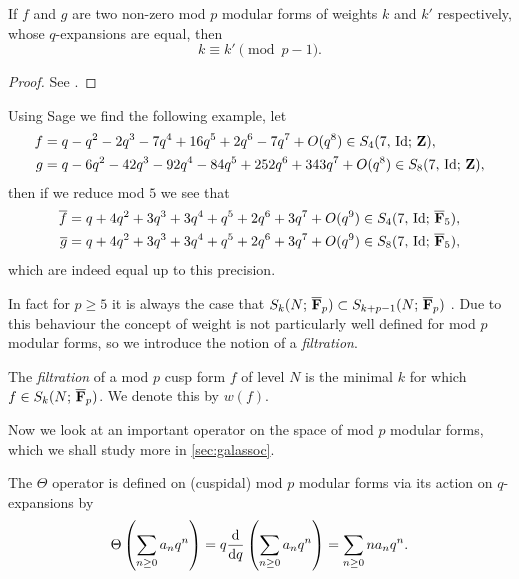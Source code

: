 \documentclass[a4paper,12pt]{article}
\begin{document}
\begin{prop}\label{prop:pm1}
If $f$ and $g$ are two non-zero mod $p$ modular forms of weights $k$ and $k'$ respectively, whose $q$-expansions are equal, then
\[
k \equiv k' \pmod{p-1}.
\]
\end{prop}
\begin{proof}
See \cite{Serre73}.
\end{proof}

\begin{ex}
Using Sage \cite{Sage} we find the following example, let
\begin{align*}
f &= q - q^{2} - 2q^{3} - 7q^{4} + 16q^{5} + 2q^{6} - 7q^{7} + O(q^{8}) \in S_{4}(7,\,\mathrm{Id};\,\mathbf{Z}),\\
g &= q - 6q^{2} - 42q^{3} - 92q^{4} - 84q^{5} + 252q^{6} + 343q^{7} + O(q^{8}) \in S_{8}(7,\,\mathrm{Id};\,\mathbf{Z}),
\end{align*}
then if we reduce mod $5$ we see that
\begin{align*}
\overline{f} &= q + 4q^{2} + 3q^{3} + 3q^{4} + q^{5} + 2q^{6} + 3q^{7} + O(q^{9}) \in S_{4}(7,\,\mathrm{Id};\,\overline{\mathbf{F}}_5),\\
\overline{g} &= q + 4q^{2} + 3q^{3} + 3q^{4} + q^{5} + 2q^{6} + 3q^{7} + O(q^{9}) \in S_{8}(7,\,\mathrm{Id};\,\overline{\mathbf{F}}_5),
\end{align*}
which are indeed equal up to this precision.
\end{ex}

In fact for $p\ge 5$ it is always the case that $S_{k}(N;\,\overline{\mathbf{F}}_p)\subset S_{k + p - 1}(N;\,\overline{\mathbf{F}}_p)$ \cite{Serre73Formes}.
Due to this behaviour the concept of weight is not particularly well defined for mod $p$ modular forms, so we introduce the notion of a \emph{filtration}.

\begin{defn}\label{def:filtration}
The \emph{filtration} of a mod $p$ cusp form $f$ of level $N$ is the minimal $k$ for which $f\in S_k(N;\,\overline{\mathbf{F}}_p)$.
We denote this by $w(f)$.
\end{defn}

Now we look at an important operator on the space of mod $p$ modular forms, which we shall study more in \cref{sec:galassoc}.

\begin{defn}\label{def:theta}
The $\Theta$ operator is defined on (cuspidal) mod $p$ modular forms via its action on $q$-expansions by
\[
\Theta\left(\sum_{n\ge 0} a_nq^n\right) = q\frac{\mathrm{d}}{\mathrm{d}q} \left(\sum_{n\ge 0} a_nq^n\right) = \sum_{n\ge 0} na_nq^n.
\]
\end{defn}
\end{document}

